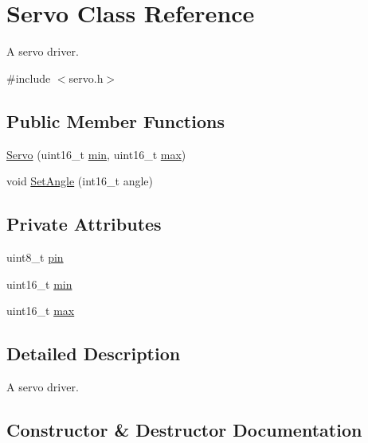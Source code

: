 \hypertarget{class_servo}{}\section{Servo Class Reference}
\label{class_servo}


A servo driver.  




{\ttfamily \#include $<$servo.\+h$>$}

\subsection*{Public Member Functions}
\begin{DoxyCompactItemize}
\item 
\hyperlink{class_servo_aa09c5cfcc57872c96f6d377343e174cf}{Servo} (uint16\+\_\+t \hyperlink{class_servo_ad04fdb646ea971c3a1395d92a64a2a1a}{min}, uint16\+\_\+t \hyperlink{class_servo_a685a44f23a5f1a58577bbf88bba3997e}{max})
\item 
void \hyperlink{class_servo_ae5ebb4d5baa92a4427e51d7667b41fbf}{Set\+Angle} (int16\+\_\+t angle)
\end{DoxyCompactItemize}
\subsection*{Private Attributes}
\begin{DoxyCompactItemize}
\item 
uint8\+\_\+t \hyperlink{class_servo_a11962573ddd272b426724e62c250990e}{pin}
\item 
uint16\+\_\+t \hyperlink{class_servo_ad04fdb646ea971c3a1395d92a64a2a1a}{min}
\item 
uint16\+\_\+t \hyperlink{class_servo_a685a44f23a5f1a58577bbf88bba3997e}{max}
\end{DoxyCompactItemize}


\subsection{Detailed Description}
A servo driver. 

\subsection{Constructor \& Destructor Documentation}
\hypertarget{class_servo_aa09c5cfcc57872c96f6d377343e174cf}{}\label{class_servo_aa09c5cfcc57872c96f6d377343e174cf} 
